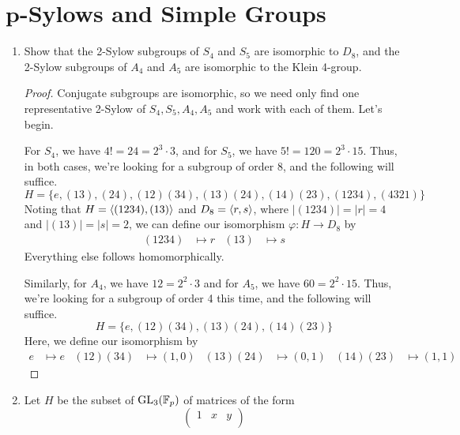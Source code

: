 \documentclass[../psets.tex]{subfiles}
\begin{document}
\section{\texorpdfstring{$\bm{p}$}{}-Sylows and Simple Groups}
\begin{enumerate}
    \item {}Show that the 2-Sylow subgroups of $S_4$ and $S_5$ are isomorphic to $D_8$, and the 2-Sylow subgroups of $A_4$ and $A_5$ are isomorphic to the Klein 4-group.
    \begin{proof}
        Conjugate subgroups are isomorphic, so we need only find one representative 2-Sylow of $S_4,S_5,A_4,A_5$ and work with each of them. Let's begin.\par
        For $S_4$, we have $4!=24=2^3\cdot 3$, and for $S_5$, we have $5!=120=2^3\cdot 15$. Thus, in both cases, we're looking for a subgroup of order 8, and the following will suffice.
        \begin{equation*}
            H = \{e,(13),(24),(12)(34),(13)(24),(14)(23),(1234),(4321)\}
        \end{equation*}
        Noting that $H=\left\langle{(1234),(13)}\right\rangle$ and $D_8=\left\langle{r,s}\right\rangle$, where $|(1234)|=|r|=4$ and $|(13)|=|s|=2$, we can define our isomorphism $\varphi:H\to D_8$ by
        \begin{align*}
            (1234) &\mapsto r&
            (13) &\mapsto s
        \end{align*}
        Everything else follows homomorphically.\par
        Similarly, for $A_4$, we have $12=2^2\cdot 3$ and for $A_5$, we have $60=2^2\cdot 15$. Thus, we're looking for a subgroup of order 4 this time, and the following will suffice.
        \begin{equation*}
            H = \{e,(12)(34),(13)(24),(14)(23)\}
        \end{equation*}
        Here, we define our isomorphism by
        \begin{align*}
            e &\mapsto e&
            (12)(34) &\mapsto (1,0)&
            (13)(24) &\mapsto (0,1)&
            (14)(23) &\mapsto (1,1)
        \end{align*}
    \end{proof}
    \item Let $H$ be the subset of $\text{GL}_3(\mathbb{F}_p)$ of matrices of the form
    \begin{equation*}
        \begin{pmatrix}
            1 & x & y\\

\end{pmatrix}
\end{equation*}
\end{enumerate}
\end{document}

